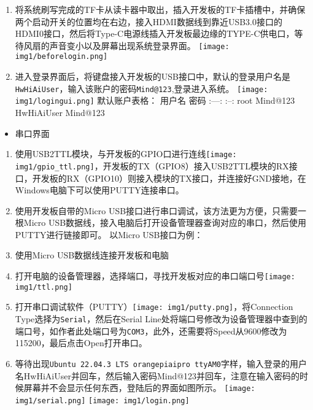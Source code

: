 \begin{enumerate}
\def\labelenumi{\arabic{enumi}.}
\tightlist
\item
  将系统刷写完成的TF卡从读卡器中取出，插入开发板的TF卡插槽中，并确保两个启动开关的位置均在右边，接入HDMI数据线到靠近USB3.0接口的HDMI0接口，然后将Type-C电源线插入开发板最边缘的TYPE-C供电口，等待风扇的声音变小以及屏幕出现系统登录界面。
  \texttt{[image: img1/beforelogin.png]}
\item
  进入登录界面后，将键盘接入开发板的USB接口中，默认的登录用户名是\texttt{HwHiAiUser}，输入该账户的密码\texttt{Mind@123},登录进入系统。
  \texttt{[image: img1/logingui.png]} 默认账户表格： \textbar{} 用户名
  \textbar{} 密码 \textbar{} \textbar{} :---: \textbar{} :--: \textbar{}
  \textbar{} root \textbar{} Mind@123 \textbar{} \textbar{} HwHiAiUser
  \textbar{} Mind@123 \textbar{}
\end{enumerate}

\begin{itemize}
\tightlist
\item
  串口界面
\end{itemize}

\begin{enumerate}
\def\labelenumi{\arabic{enumi}.}
\tightlist
\item
  使用USB2TTL模块，与开发板的GPIO口进行连线\texttt{[image: img1/gpio\_ttl.png]}，开发板的TX（GPIO8）接入USB2TTL模块的RX接口，开发板的RX（GPIO10）则接入模块的TX接口，并连接好GND接地，在Windows电脑下可以使用PUTTY连接串口。
\item
  使用开发板自带的Micro
  USB接口进行串口调试，该方法更为方便，只需要一根Micro
  USB数据线，接入电脑后打开设备管理器查询对应的串口，然后使用PUTTY进行链接即可。
  以Micro USB接口为例：
\item
  使用Micro USB数据线连接开发板和电脑
\item
  打开电脑的设备管理器，选择端口，寻找开发板对应的串口端口号\texttt{[image: img1/ttl.png]}
\item
  打开串口调试软件（PUTTY）\texttt{[image: img1/putty.png]}，将Connection
  Type选择为\texttt{Serial}，然后在Serial
  Line处将端口号修改为设备管理器中查到的端口号，如作者此处端口号为\texttt{COM3}，此外，还需要将Speed从9600修改为115200，最后点击Open打开串口。
\item
  等待出现\texttt{Ubuntu\ 22.04.3\ LTS\ orangepiaipro\ ttyAM0}字样，输入登录的用户名HwHiAiUser并回车，然后输入密码Mind@123并回车，注意在输入密码的时候屏幕并不会显示任何东西，登陆后的界面如图所示。
  \texttt{[image: img1/serial.png]} \texttt{[image: img1/login.png]}
\end{enumerate}

